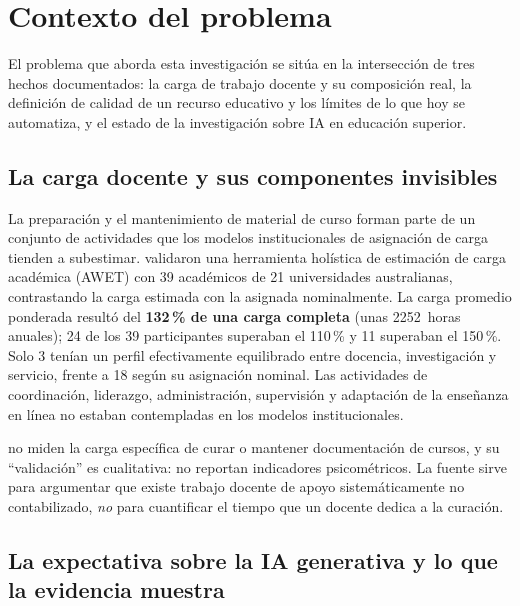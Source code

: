 \section{Contexto del problema}
\label{sec:contexto}

El problema que aborda esta investigación se sitúa en la intersección de tres
hechos documentados: la carga de trabajo docente y su composición real, la
definición de calidad de un recurso educativo y los límites de lo que hoy se
automatiza, y el estado de la investigación sobre IA en educación superior.

\subsection{La carga docente y sus componentes invisibles}
\label{sec:contexto-carga}

La preparación y el mantenimiento de material de curso forman parte de un conjunto
de actividades que los modelos institucionales de asignación de carga tienden a
subestimar. \textcite{kenny2023life} validaron una herramienta holística de
estimación de carga académica (AWET) con 39 académicos de 21 universidades
australianas, contrastando la carga estimada con la asignada nominalmente. La carga
promedio ponderada resultó del \textbf{132\,\% de una carga completa} (unas
2252~horas anuales); 24 de los 39 participantes superaban el 110\,\% y 11 superaban
el 150\,\%. Solo 3 tenían un perfil efectivamente equilibrado entre docencia,
investigación y servicio, frente a 18 según su asignación nominal. Las actividades
de coordinación, liderazgo, administración, supervisión y adaptación de la
enseñanza en línea no estaban contempladas en los modelos institucionales.

\begin{advertencia}
\textcite{kenny2023life} no miden la carga específica de curar o mantener
documentación de cursos, y su \enquote{validación} es cualitativa: no reportan
indicadores psicométricos. La fuente sirve para argumentar que existe trabajo
docente de apoyo sistemáticamente no contabilizado, \emph{no} para cuantificar el
tiempo que un docente dedica a la curación.
\end{advertencia}

\subsection{La expectativa sobre la IA generativa y lo que la evidencia muestra}
\label{sec:contexto-genai}

